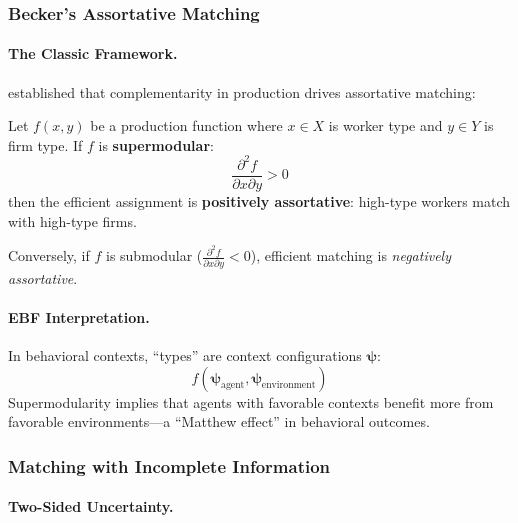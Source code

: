\subsubsection{Becker's Assortative Matching}

\paragraph{The Classic Framework.}

\citet{becker1973theory} established that complementarity in production drives 
assortative matching:

\begin{theorem}
\label{thm:becker}
Let $f(x, y)$ be a production function where $x \in X$ is worker type and $y \in Y$ 
is firm type. If $f$ is \textbf{supermodular}:
\begin{equation}
\frac{\partial^2 f}{\partial x \partial y} > 0
\end{equation}
then the efficient assignment is \textbf{positively assortative}: high-type workers 
match with high-type firms.
\end{theorem}

Conversely, if $f$ is submodular ($\frac{\partial^2 f}{\partial x \partial y} < 0$), 
efficient matching is \emph{negatively assortative}.

\paragraph{EBF Interpretation.}

In behavioral contexts, ``types'' are context configurations $\boldsymbol{\psi}$:
\begin{equation}
f(\boldsymbol{\psi}_{\text{agent}}, \boldsymbol{\psi}_{\text{environment}})
\end{equation}
Supermodularity implies that agents with favorable contexts benefit more from 
favorable environments---a ``Matthew effect'' in behavioral outcomes.

\subsubsection{Matching with Incomplete Information}

\paragraph{Two-Sided Uncertainty.}

